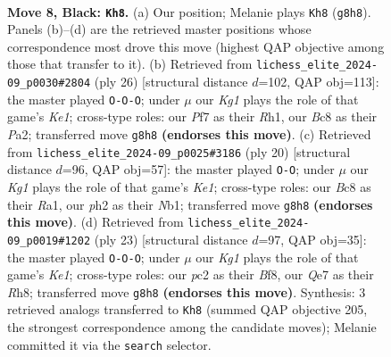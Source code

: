 \documentclass[11pt]{article}
\begin{document}
\begin{figure}[p]\centering
\begin{subfigure}{0.46\textwidth}\centering
\resizebox{\linewidth}{!}{%
\newchessgame
\chessboard[
  setfen={rnb2rk1/pppnqppp/4p3/3pP3/3P1PQ1/2N5/PPP3PP/R3KBNR b KQ - 2 8},
  showmover=false,
  pgfstyle=straightmove, color=movearrow, markmove={g8-h8}
]}
\caption{}
\end{subfigure}\hfill
\begin{subfigure}{0.46\textwidth}\centering
\resizebox{\linewidth}{!}{%
\newchessgame
\chessboard[
  setfen={rn3rk1/ppp2pp1/4p1bp/4P3/4p1Pq/1P2P2P/PBPNQP2/R3K2R w KQ - 3 14},
  showmover=false,
  pgfstyle=straightmove, color=movearrow, markmove={e1-c1}
]}
\caption{}
\end{subfigure}
\\[4pt]
\begin{subfigure}{0.46\textwidth}\centering
\resizebox{\linewidth}{!}{%
\newchessgame
\chessboard[
  setfen={rn2kb1r/pp3ppp/1q1Pp3/2pnP3/2p5/P4N2/1P3PPP/RNBQK2R w KQkq - 1 11},
  showmover=false,
  pgfstyle=straightmove, color=movearrow, markmove={e1-g1}
]}
\caption{}
\end{subfigure}\hfill
\begin{subfigure}{0.46\textwidth}\centering
\resizebox{\linewidth}{!}{%
\newchessgame
\chessboard[
  setfen={r3kb1r/pp1qnpp1/1np1p3/4P1Bp/3P3P/2NQ2N1/PP3PP1/R3K2R b KQkq - 4 12},
  showmover=false,
  pgfstyle=straightmove, color=movearrow, markmove={e8-c8}
]}
\caption{}
\end{subfigure}
\caption{\textbf{Move 8, Black: \texttt{Kh8}.} (a) Our position; Melanie plays \texttt{Kh8} (\texttt{g8h8}). Panels (b)--(d) are the retrieved master positions whose correspondence most drove this move (highest QAP objective among those that transfer to it). (b) Retrieved from \texttt{lichess\_elite\_2024-09\_p0030\#2804} (ply 26) [structural distance $d$=102, QAP obj=113]: the master played \texttt{O-O-O}; under $\mu$ our \emph{Kg1} plays the role of that game's \emph{Ke1}; cross-type roles: our \emph{P}f7 as their \emph{R}h1, our \emph{B}c8 as their \emph{P}a2; transferred move \texttt{g8h8} \textbf{(endorses this move)}. (c) Retrieved from \texttt{lichess\_elite\_2024-09\_p0025\#3186} (ply 20) [structural distance $d$=96, QAP obj=57]: the master played \texttt{O-O}; under $\mu$ our \emph{Kg1} plays the role of that game's \emph{Ke1}; cross-type roles: our \emph{B}c8 as their \emph{R}a1, our \emph{p}h2 as their \emph{N}b1; transferred move \texttt{g8h8} \textbf{(endorses this move)}. (d) Retrieved from \texttt{lichess\_elite\_2024-09\_p0019\#1202} (ply 23) [structural distance $d$=97, QAP obj=35]: the master played \texttt{O-O-O}; under $\mu$ our \emph{Kg1} plays the role of that game's \emph{Ke1}; cross-type roles: our \emph{p}c2 as their \emph{B}f8, our \emph{Q}e7 as their \emph{R}h8; transferred move \texttt{g8h8} \textbf{(endorses this move)}. Synthesis: 3 retrieved analogs transferred to \texttt{Kh8} (summed QAP objective 205, the strongest correspondence among the candidate moves); Melanie committed it via the \texttt{search} selector.}
\label{fig:thought-m15}
\end{figure}
\end{document}

